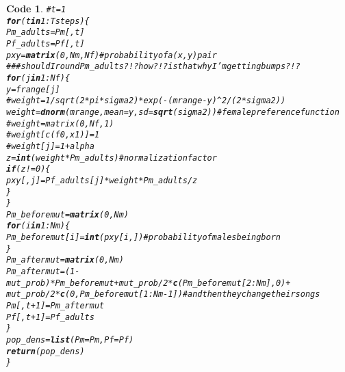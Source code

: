 \documentclass{article}\usepackage[]{graphicx}\usepackage[]{color}
\makeatletter
\newcommand{\hlnum}[1]{\textcolor[rgb]{0.686,0.059,0.569}{#1}}%
\newcommand{\hlcom}[1]{\textcolor[rgb]{0.678,0.584,0.686}{\textit{#1}}}%
\newcommand{\hlopt}[1]{\textcolor[rgb]{0,0,0}{#1}}%
\newcommand{\hlstd}[1]{\textcolor[rgb]{0.345,0.345,0.345}{#1}}%
\newcommand{\hlkwa}[1]{\textcolor[rgb]{0.161,0.373,0.58}{\textbf{#1}}}%
\newcommand{\hlkwb}[1]{\textcolor[rgb]{0.69,0.353,0.396}{#1}}%
\newcommand{\hlkwc}[1]{\textcolor[rgb]{0.333,0.667,0.333}{#1}}%
\newcommand{\hlkwd}[1]{\textcolor[rgb]{0.737,0.353,0.396}{\textbf{#1}}}%
\newenvironment{kframe}{%
 \def\at@end@of@kframe{}%
 \ifinner\ifhmode%
  \def\at@end@of@kframe{\end{minipage}}%
  \begin{minipage}{\columnwidth}%
 \fi\fi%
 \def\FrameCommand##1{\hskip\@totalleftmargin \hskip-\fboxsep
 \colorbox{shadecolor}{##1}\hskip-\fboxsep
     \hskip-\linewidth \hskip-\@totalleftmargin \hskip\columnwidth}%
 \MakeFramed {\advance\hsize-\width
   \@totalleftmargin\z@ \linewidth\hsize
   \@setminipage}}%
 {\par\unskip\endMakeFramed%
 \at@end@of@kframe}
\newenvironment{knitrout}{}{} %
\newtheorem{rexample}{Code}[section]
\makeatother
\begin{document}
\begin{knitrout}
\begin{kframe}
\begin{rexample}
\begin{alltt}
\hlcom{# t = 1}
\hlkwa{for}\hlstd{(t} \hlkwa{in} \hlnum{1}\hlopt{:}\hlstd{Tsteps)\{}
        \hlstd{Pm_adults} \hlkwb{=} \hlstd{Pm[,t]}
        \hlstd{Pf_adults} \hlkwb{=} \hlstd{Pf[,t]}
        \hlstd{pxy} \hlkwb{=} \hlkwd{matrix}\hlstd{(}\hlnum{0}\hlstd{,Nm,Nf)} \hlcom{#probability of a (x,y) pair}
        \hlcom{### should I round Pm_adults?!? how?!? is that why I'm getting bumps?!?}
        \hlkwa{for}\hlstd{(j} \hlkwa{in} \hlnum{1}\hlopt{:}\hlstd{Nf)\{}
                \hlstd{y} \hlkwb{=} \hlstd{frange[j]}
                \hlcom{# weight = 1/sqrt(2*pi*sigma2)*exp(-(mrange-y)^2/(2*sigma2))}
                \hlstd{weight} \hlkwb{=} \hlkwd{dnorm}\hlstd{(mrange,}\hlkwc{mean}\hlstd{=y,}\hlkwc{sd}\hlstd{=}\hlkwd{sqrt}\hlstd{(sigma2))} \hlcom{#female preference function}
                \hlcom{# weight = matrix (0,Nf,1)}
                \hlcom{# weight[c(f0,x1)] = 1}
                \hlcom{# weight[j] = 1+alpha}
                \hlstd{z} \hlkwb{=} \hlkwd{int}\hlstd{(weight}\hlopt{*}\hlstd{Pm_adults)} \hlcom{#normalization factor}
                \hlkwa{if}\hlstd{(z}\hlopt{!=}\hlnum{0}\hlstd{)\{}
                        \hlstd{pxy[,j]} \hlkwb{=} \hlstd{Pf_adults[j]}\hlopt{*}\hlstd{weight}\hlopt{*}\hlstd{Pm_adults}\hlopt{/}\hlstd{z}
                        \hlstd{\}}
        \hlstd{\}}
        \hlstd{Pm_beforemut} \hlkwb{=} \hlkwd{matrix}\hlstd{(}\hlnum{0}\hlstd{,Nm)}
        \hlkwa{for}\hlstd{(i} \hlkwa{in} \hlnum{1}\hlopt{:}\hlstd{Nm)\{}
                \hlstd{Pm_beforemut[i]} \hlkwb{=} \hlkwd{int}\hlstd{(pxy[i,])} \hlcom{#probability of males being born}
        \hlstd{\}}
        \hlstd{Pm_aftermut} \hlkwb{=} \hlkwd{matrix}\hlstd{(}\hlnum{0}\hlstd{,Nm)}
        \hlstd{Pm_aftermut} \hlkwb{=} \hlstd{(}\hlnum{1}\hlopt{-}\hlstd{mut_prob)}\hlopt{*}\hlstd{Pm_beforemut} \hlopt{+} \hlstd{mut_prob}\hlopt{/}\hlnum{2}\hlopt{*}\hlkwd{c}\hlstd{(Pm_beforemut[}\hlnum{2}\hlopt{:}\hlstd{Nm],}\hlnum{0}\hlstd{)} \hlopt{+}
                \hlstd{mut_prob}\hlopt{/}\hlnum{2}\hlopt{*}\hlkwd{c}\hlstd{(}\hlnum{0}\hlstd{,Pm_beforemut[}\hlnum{1}\hlopt{:}\hlstd{Nm}\hlopt{-}\hlnum{1}\hlstd{])} \hlcom{#and then they change their songs}
        \hlstd{Pm[,t}\hlopt{+}\hlnum{1}\hlstd{]} \hlkwb{=} \hlstd{Pm_aftermut}
        \hlstd{Pf[,t}\hlopt{+}\hlnum{1}\hlstd{]} \hlkwb{=} \hlstd{Pf_adults}
\hlstd{\}}
\hlstd{pop_dens} \hlkwb{=} \hlkwd{list}\hlstd{(}\hlkwc{Pm}\hlstd{=Pm,}\hlkwc{Pf}\hlstd{=Pf)}
\hlkwd{return}\hlstd{(pop_dens)}
\hlstd{\}}
\end{alltt}
\end{rexample}\end{kframe}
\end{knitrout}
\end{document}
